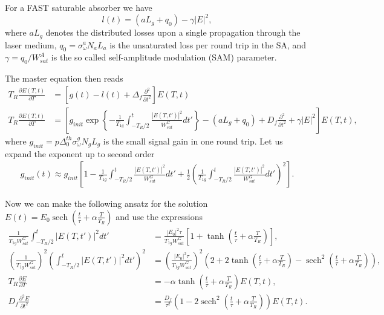 \documentclass[preprint,secnumarabic,amssymb, nobibnotes, aip, prd]{revtex4-1}
\def\p{\partial}
\DeclareMathOperator{\sech}{sech}
\begin{document}
For a FAST saturable absorber we have~\cite{haus1975theory}
\begin{equation}
l(t) = (aL_g+q_0) -\gamma |E|^2,
\end{equation}
where $aL_g$ denotes the distributed losses upon a single propagation through the laser medium, $q_0 = \sigma_\omega^a N_aL_a$ is the unsaturated loss per round trip in the SA, and $\gamma = q_0/W_{sat}^A$ is the so called self-amplitude modulation (SAM) parameter.



The master equation then reads
\begin{align}
\label{eq:master-equation}
T_R \frac{\p E(T,t)}{\p T} &= \left[g(t) - l(t) +\Delta_f \frac{\p^2}{\p t^2}\right]E(T,t) \nonumber \\
T_R \frac{\p E(T,t)}{\p T} &= \left[ g_{init}\exp\left \{-\frac{1}{T_{1g}} \int_{-T_R/2}^{t} \frac{|E(T,t')|^2}{W_{sat}^G}dt' \right \} - (aL_g+q_0)  +D_f \frac{\p^2}{\p t^2} +\gamma |E|^2\right]E(T,t),
\end{align}
where $ g_{init} =  p\Delta_0^{th} \sigma_\omega^g N_g  L_g$ is the small signal gain in one round trip. 
Let us expand the exponent up to second order
\begin{align}
g_{init}(t) \approx  g_{init}\left [ 1-\frac{1}{T_{1g}} \int_{-T_R/2}^{t} \frac{|E(T,t')|^2}{W_{sat}^G}dt' +\frac{1}{2} \left(\frac{1}{T_{1g}} \int_{-T_R/2}^{t} \frac{|E(T,t')|^2}{W_{sat}^G}dt'\right)^2 \right ].
\end{align}

Now we can make the following ansatz for the solution $E(t) = E_0 \sech(\frac{t}{\tau} +\alpha \frac{T}{T_R})$ and use the expressions~\cite{haus1975theoryslow}
\begin{align}
\frac{1}{T_{1g}W_{sat}^G}\int_{-T_R/2}^{t} |E(T,t')|^2dt' &= \frac{|E_0|^2\tau}{T_{1g}W_{sat}^G} [1+\tanh(\frac{t}{\tau}+\alpha \frac{T}{T_R})], \\ 
(\frac{1}{T_{1g}W_{sat}^G})^2\left (\int_{-T_R/2}^{t} |E(T,t')|^2dt' \right)^2 &=  \left(\frac{|E_0|^2\tau}{T_{1g}W_{sat}^G}\right)^2 \left(2+2\tanh(\frac{t}{\tau}+\alpha \frac{T}{T_R}) - \sech^2(\frac{t}{\tau}+\alpha \frac{T}{T_R})\right), \\
T_R\frac{\p E}{\p T} &= -\alpha \tanh(\frac{t}{\tau}+\alpha \frac{T}{T_R}) E(T,t), \\
D_f\frac{\p^2 E}{\p t^2} &= \frac{D_f}{\tau^2}\left( 1-2\sech^2(\frac{t}{\tau}+\alpha \frac{T}{T_R}) \right) E(T,t).
\end{align}
\end{document}
